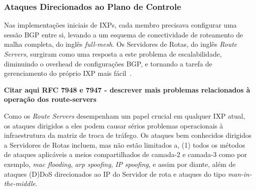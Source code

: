\documentclass[12pt]{article}
\begin{document}

\subsubsection{Ataques Direcionados ao Plano de Controle}
Nas implementações iniciais de IXPs, cada membro precisava configurar uma sessão BGP entre si, levando a um esquema de conectividade de roteamento de malha completa, do inglês \textit{full-mesh}. Os Servidores de Rotas, do inglês \textit{Route Servers}, surgiram como uma resposta a este problema de escalabilidade, diminuindo o overhead de configurações BGP, e tornando a tarefa de gerenciamento do próprio IXP mais fácil~\cite{lu2005networking}.

\textbf{Citar aqui RFC 7948 e 7947 - descrever mais problemas relacionados à operação dos route-servers}


Como os \textit{Route Servers} desempenham um papel crucial em qualquer IXP atual, os ataques dirigidos a eles podem causar sérios problemas operacionais à infraestrutura da matriz de troca de tráfego. Os ataques bem conhecidos dirigidos a Servidores de Rotas incluem, mas não estão limitados a, (1) todos os métodos de ataques aplicáveis a meios compartilhados de camada-2 e camada-3 como por exemplo, \textit{mac flooding}, \textit{arp spoofing}, \textit{IP spoofing}, e assim por diante, além de ataques (D)DoS direcionados ao IP do Servidor de rota e ataques do tipo \textit{man-in-the-middle}.

\end{document}
